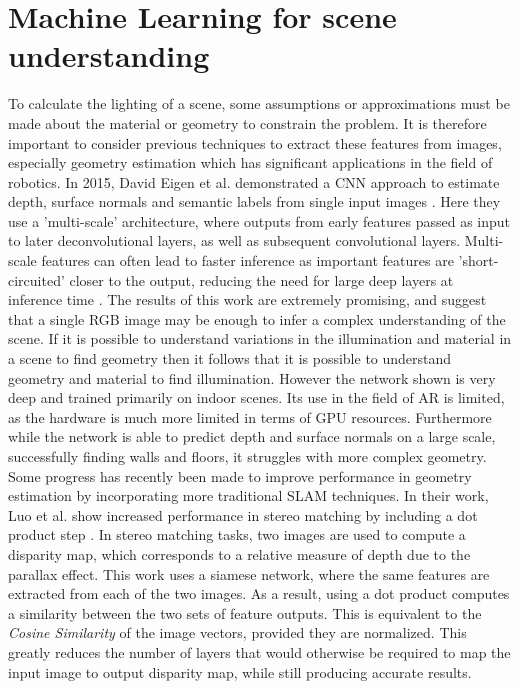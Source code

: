 \documentclass[ %
                    author={Gavin Parker},
                supervisor={Dr. Neill Campbell},
                    degree={MEng},
                     title={Deep Siamese Networks for Illumination Estimation from Stereo Images},
                  subtitle={},
                      type={research},
                      year={2018} ]{dissertation}
\begin{document}
\section{Machine Learning for scene understanding}
To calculate the lighting of a scene, some assumptions or approximations must be made about the material or geometry to constrain the problem. It is therefore important to consider previous techniques to extract these features from images, especially geometry estimation which has significant applications in the field of robotics. In 2015, David Eigen et al. demonstrated a CNN approach to estimate depth, surface normals and semantic labels from single input images \cite{7410661}. Here they use a 'multi-scale' architecture, where outputs from early features passed as input to later deconvolutional layers, as well as subsequent convolutional layers. Multi-scale features can often lead to faster inference as important features are 'short-circuited' closer to the output, reducing the need for large deep layers at inference time . The results of this work are extremely promising, and suggest that a single RGB image may be enough to infer a complex understanding of the scene. If it is possible to understand variations in the illumination and material in a scene to find geometry then it follows that it is possible to understand geometry and material to find illumination.  However the network shown is very deep and trained primarily on indoor scenes. Its use in the field of AR is limited, as the hardware is much more limited in terms of GPU resources. Furthermore while the network is able to predict depth and surface normals on a large scale, successfully finding walls and floors, it struggles with more complex geometry. Some progress has recently been made to improve performance in geometry estimation by incorporating more traditional SLAM techniques. In their work, Luo et al. show increased performance in stereo matching by including a dot product step \cite{7780983}. In stereo matching tasks, two images are used to compute a disparity map, which corresponds to a relative measure of depth due to the parallax effect. This work uses a siamese network, where the same features are extracted from each of the two images. As a result, using a dot product computes a similarity between the two sets of feature outputs. This is equivalent to the \textit{Cosine Similarity} of the image vectors, provided they are normalized. This greatly reduces the number of layers that would otherwise be required to map the input image to output disparity map, while still producing accurate results.
\end{document}
